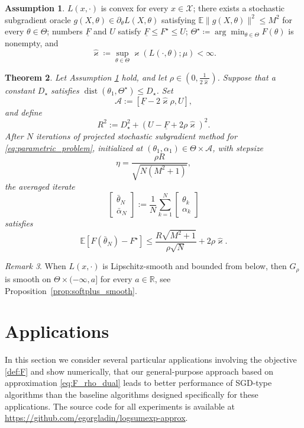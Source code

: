 \documentclass{article}
\newcommand{\R}{\mathbb{R}}
\newcommand{\E}{\mathbb{E}}
\newcommand*{\eqset}{\coloneqq}
\def\cX{\mathcal{X}}
\theoremstyle{plain}
\newtheorem{theorem}{Theorem}[section]
\theoremstyle{definition}
\newtheorem{assumption}[theorem]{Assumption}
\theoremstyle{remark}
\newtheorem{remark}[theorem]{Remark}
\begin{document}
\begin{assumption}\label{asmp}
    \(L(x,\cdot)\) is convex for every \(x \in \cX\); 
    there exists a stochastic subgradient oracle \(g(X,\theta)\in \partial_\theta L(X,\theta)\) satisfying \(\E\|g(X,\theta)\|^2\le M^2\) for every \(\theta\in\Theta\); 
    numbers \(\underline{F}\) and \(U\) satisfy \(\underline{F} \leq F^\star \leq U\); \(\Theta^\star \eqset \arg\min_{\theta \in \Theta}F(\theta)\) is nonempty, and
    \[
        \hat{\varkappa} \eqset \sup_{\theta\in\Theta} \varkappa(L(\cdot,\theta);\mu) < \infty .
    \]
\end{assumption}
\begin{theorem}\label{thm:convergence}
    Let Assumption \ref{asmp} hold, and let \(\rho \in \left(0, \frac{1}{2\hat{\varkappa}}\right)\). 
    Suppose that a constant \(D_\star\) satisfies \(\operatorname{dist}(\theta_1,\Theta^\star)\le D_\star\). 
    Set
    \[
        \mathcal A:=[\underline F-2\hat{\varkappa}\rho,U], 
    \]
    and define
    \[
        R^2
        :=
        D_\star^2
        + (U-\underline F+2\rho\hat{\varkappa})^2 .
    \]
    After \(N\) iterations of projected stochastic subgradient method for
    \eqref{eq:parametric_problem}, initialized at
    \((\theta_1,\alpha_1)\in\Theta\times\mathcal A\),  with stepsize
    \[
        \eta=\frac{\rho R}{\sqrt{N(M^2+1)}},
    \]
    the averaged iterate
    \[
        \begin{bmatrix}
            \bar\theta_N\\
            \bar\alpha_N
        \end{bmatrix}
        :=
        \frac1N\sum_{k=1}^N
        \begin{bmatrix}
            \theta_k\\
            \alpha_k
        \end{bmatrix}
    \]
    satisfies
    \[
        \E[F(\bar\theta_N)-F^\star]
        \le
        \frac{R\sqrt{M^2+1}}{\rho\sqrt N}
        +
        2\rho\hat{\varkappa}.
    \]
\end{theorem}

\begin{remark}
    When \(L(x,\cdot)\) is Lipschitz-smooth and 
    bounded from below, then \(G_\rho\) is smooth on
    \(\Theta\times(-\infty,a]\) for every \(a\in\R\), see Proposition~\ref{prop:softplus_smooth}.
\end{remark}


\section{Applications}\label{sec:applications}
In this section we consider several particular applications involving the objective \eqref{def:F} and show numerically, that our general-purpose approach based on approximation \eqref{eq:F_rho_dual} leads to better performance of SGD-type algorithms than the baseline algorithms designed specifically for these applications.
The source code for all experiments is available at \url{https://github.com/egorgladin/logsumexp-approx}.
\end{document}
